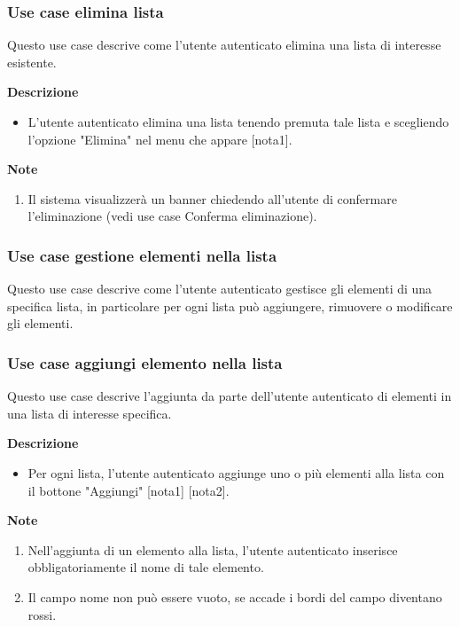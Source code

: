 \documentclass[a4paper,12pt]{article}
\begin{document}
\subsubsection*{Use case elimina lista}

Questo use case descrive come l'utente autenticato elimina una lista di interesse esistente.

\textbf{Descrizione}
\begin{itemize} \setlength\itemsep{0.01em}
\item L'utente autenticato elimina una lista tenendo premuta tale lista e scegliendo l'opzione "Elimina" nel menu che appare [nota1].
\end{itemize}

\textbf{Note}
\begin{enumerate} \setlength\itemsep{0.01em}
\item Il sistema visualizzerà un banner chiedendo all'utente di confermare l'eliminazione (vedi use case Conferma eliminazione).
\end{enumerate}





\subsubsection*{Use case gestione elementi nella lista}

Questo use case descrive come l'utente autenticato gestisce gli elementi di una specifica lista, in particolare per ogni lista può aggiungere, rimuovere o modificare gli elementi.


\subsubsection*{Use case aggiungi elemento nella lista}

Questo use case descrive l'aggiunta da parte dell'utente autenticato di elementi in una lista di interesse specifica.

\textbf{Descrizione}
\begin{itemize} \setlength\itemsep{0.01em}
\item Per ogni lista, l'utente autenticato aggiunge uno o più elementi alla lista con il bottone "Aggiungi" [nota1] [nota2].
\end{itemize}

\textbf{Note}
\begin{enumerate} \setlength\itemsep{0.01em}
\item Nell'aggiunta di un elemento alla lista, l'utente autenticato inserisce obbligatoriamente il nome di tale elemento.
\item Il campo nome non può essere vuoto, se accade i bordi del campo diventano rossi.
\end{enumerate}
\end{document}
